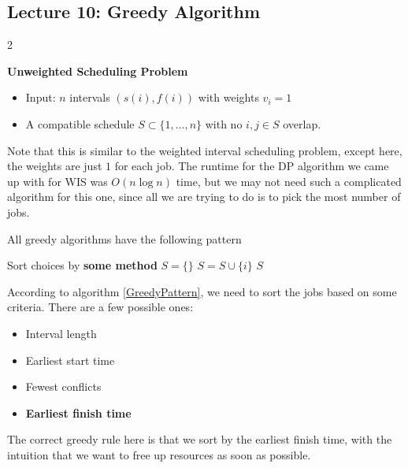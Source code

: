 \subsection{Lecture 10: Greedy Algorithm}
\begin{multicols}{2}
    \begin{leftbar}
        \textbf{Unweighted Scheduling Problem}

        \begin{itemize}
            \item Input: $n$ intervals $(s(i), f(i))$ with weights $v_i = 1$
            \item A compatible schedule $S \subset \{1, \ldots, n\}$ with no $i, j \in S$ overlap. 
        \end{itemize}
    \end{leftbar}
    Note that this is similar to the weighted interval scheduling problem, except here, the weights are just $1$ for each job. The runtime for the DP algorithm we came up with for WIS was $O(n\log n)$ time, but we may not need such a complicated algorithm for this one, since all we are trying to do is to pick the most number of jobs. 

    All greedy algorithms have the following pattern 
    \bigskip
    \begin{algorithm}[H]
        \caption{Greedy Algorithm Pattern}
        \label{GreedyPattern}
        \begin{algorithmic}
        \State Sort choices by \textbf{some method}
        \State $S = \{\}$
                \State $S = S \cup \{i\}$
            \EndIf
        \EndFor
        \State\Return $S$
        \end{algorithmic}
    \end{algorithm}

    According to algorithm \ref{GreedyPattern}, we need to sort the jobs based on some criteria. There are a few possible ones: 
    \begin{itemize}
        \item Interval length
        \item Earliest start time
        \item Fewest conflicts
        \item \textbf{Earliest finish time}
    \end{itemize}
    The correct greedy rule here is that we sort by the earliest finish time, with the intuition that we want to free up resources as soon as possible. 


\end{multicols}
